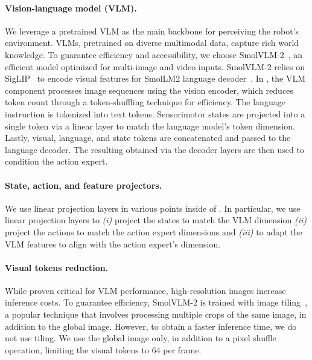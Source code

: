 \paragraph{Vision-language model (VLM).}
We leverage a pretrained VLM as the main backbone for perceiving the robot’s environment. VLMs, pretrained on diverse multimodal data, capture rich world knowledge. To guarantee efficiency and accessibility, we choose SmolVLM-2~\citep{marafioti2025smolvlm}, an efficient model optimized for multi-image and video inputs. 
SmolVLM-2 relies on SigLIP~\citep{li2023siglip} to encode visual features for SmolLM2 language decoder~\citep{allal2025smollm2}.
In \ours, the VLM component processes image sequences using the vision encoder, which reduces token count through a token-shuffling technique for efficiency. The language instruction is tokenized into text tokens. Sensorimotor states are projected into a single token via a linear layer to match the language model’s token dimension. Lastly, visual, language, and state tokens are concatenated and passed to the language decoder. The resulting obtained via the decoder layers are then used to condition the action expert.

\paragraph{State, action, and feature projectors.}
We use linear projection layers in various points inside of \ours. In particular, we use linear projection layers to \emph{(i)} project the states to match the VLM dimension \emph{(ii)} project the actions to match the action expert dimensions and \emph{(iii)} to adapt the VLM features to align with the action expert’s dimension.

\paragraph{Visual tokens reduction.}
While proven critical for VLM performance, high-resolution images increase inference costs. 
To guarantee efficiency, SmolVLM-2 is trained with image tiling~\citep{lin2023sphinx}, a popular technique that involves processing multiple crops of the same image, in addition to the global image. 
However, to obtain a faster inference time, we do not use tiling. We use the global image only, in addition to a pixel shuffle operation, limiting the visual tokens to 64 per frame.

